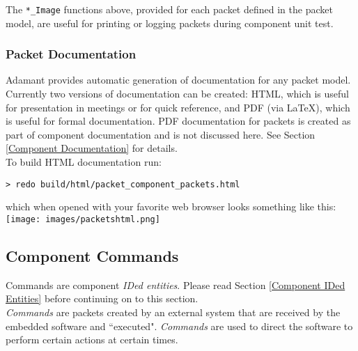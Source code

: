 
The \texttt{*\_Image} functions above, provided for each packet defined in the packet model, are useful for printing or logging packets during component unit test.

\subsubsection{Packet Documentation}

Adamant provides automatic generation of documentation for any packet model. Currently two versions of documentation can be created: HTML, which is useful for presentation in meetings or for quick reference, and PDF (via \LaTeX), which is useful for formal documentation. PDF documentation for packets is created as part of component documentation and is not discussed here. See Section \ref{Component Documentation} for details. \\

To build HTML documentation run:

\vspace{5mm} %
\begin{verbatim}
> redo build/html/packet_component_packets.html
\end{verbatim}
\vspace{5mm} %

which when opened with your favorite web browser looks something like this: \\

\vspace{5mm} %
\texttt{[image: images/packetshtml.png]}
\vspace{5mm} %

\subsection{Component Commands} \label{Commands}

Commands are component \textit{IDed entities}. Please read Section \ref{Component IDed Entities} before continuing on to this section. \\

\textit{Commands} are packets created by an external system that are received by the embedded software and ``executed". \textit{Commands} are used to direct the software to perform certain actions at certain times.

